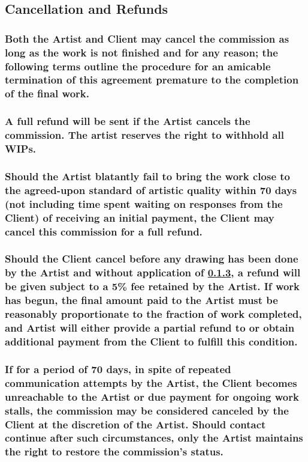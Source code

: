 \documentclass{article}
\begin{document}
\begin{flushleft}
	\leftskip=1cm
	\subsection{Cancellation and Refunds}
	\leftskip=2cm

		\subsubsection[At-will Termination]{\normalfont Both the Artist and Client may cancel the commission as long as the work is not finished and for any reason; the following terms outline the procedure for an amicable termination of this agreement premature to the completion of the final work.}
		
		\subsubsection[Cancellation by the Artist]{\normalfont A full refund will be sent if the Artist cancels the commission. The artist reserves the right to withhold all WIPs.}
		
		\subsubsection[Failure to Complete by Deadline]{\normalfont Should the Artist blatantly fail to bring the work close to the agreed-upon standard of artistic quality within 70 days (not including time spent waiting on responses from the Client) of receiving an initial payment, the Client may cancel this commission for a full refund.}\label{failuretocomplete}
		
		\subsubsection[Cancellation by the Client]{\normalfont Should the Client cancel before any drawing has been done by the Artist and without application of \ref{failuretocomplete}, a refund will be given subject to a 5\% fee retained by the Artist. If work has begun, the final amount paid to the Artist must be reasonably proportionate to the fraction of work completed, and Artist will either provide a partial refund to or obtain additional payment from the Client to fulfill this condition.}

		\subsubsection[Unreachable Client]{\normalfont If for a period of 70 days, in spite of repeated communication attempts by the Artist, the Client becomes unreachable to the Artist or due payment for ongoing work stalls, the commission may be considered canceled by the Client at the discretion of the Artist. Should contact continue after such circumstances, only the Artist maintains the right to restore the commission's status.}


\end{flushleft}
\end{document}
